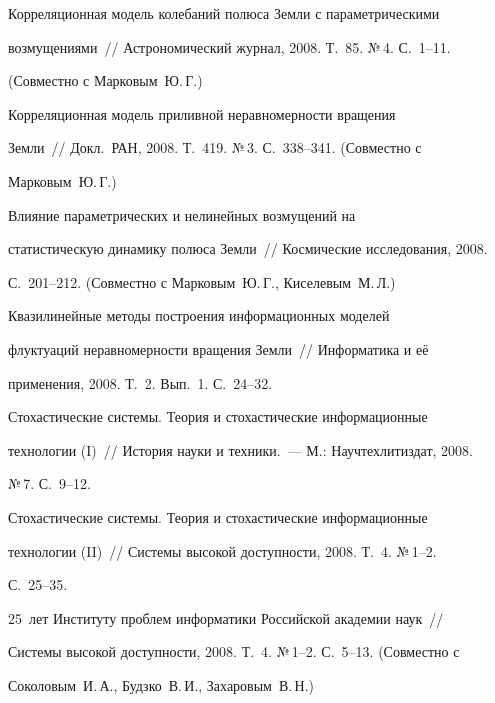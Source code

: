 




 Корреляционная модель колебаний полюса Земли с па\-ра\-мет\-ри\-че\-ски\-ми


возмущениями~// Астрономический журнал, 2008. Т.~85. №\,4. С.~1--11.


(Совместно с Марковым~Ю.\,Г.)





 Корреляционная модель приливной неравномерности вращения


Земли~// Докл.\ РАН, 2008. Т.~419. №\,3. С.~338--341. (Совместно с


Марковым~Ю.\,Г.)





 Влияние параметрических и нелинейных возмущений на


статистическую динамику полюса Земли~// Космические исследования, 2008.


С.~201--212. (Совместно с Марковым~Ю.\,Г., Киселевым~М.\,Л.)





 Квазилинейные методы построения информационных моделей


флуктуаций неравномерности вращения Земли~// Информатика и её


применения, 2008. Т.~2. Вып.~1. С.~24--32.





 Стохастические системы. Теория и стохастические информационные


технологии (I)~// История науки и техники.~--- М.: Научтехлитиздат, 2008.


№\,7. С.~9--12.





 Стохастические системы. Теория и стохастические информационные


технологии (II)~// Системы высокой доступности, 2008. Т.~4. №\,1--2.


 С.~25--35.





 25~лет Институту проблем информатики Российской академии наук~//


Системы высокой доступности, 2008. Т.~4. №\,1--2. С.~5--13. (Совместно с


Соколовым~И.\,А., Будзко~В.\,И., Захаровым~В.\,Н.)





